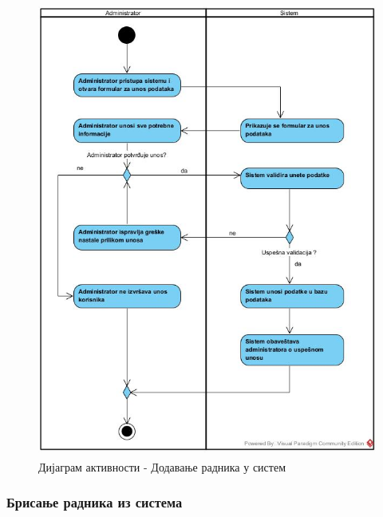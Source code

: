 \documentclass{article}
\begin{document}
\begin{figure}[H]
    \centering
    \includegraphics[width=1.1\textwidth, height=15cm]{Dijagrami_slike/dodavanje_radnika.jpg}
    \caption{Дијаграм активности - Додавање радника у систем}
\end{figure}

\newpage
\subsubsection{Брисање радника из система}
\end{document}
